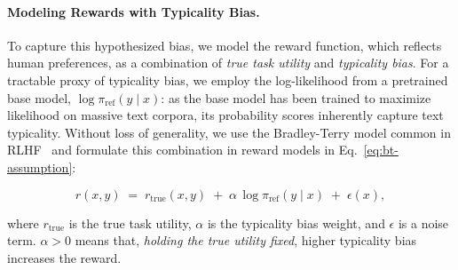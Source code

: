 \paragraph{Modeling Rewards with Typicality Bias.} To capture this hypothesized bias, we model the reward function, which reflects human preferences, as a combination of \emph{true task utility} and \emph{typicality bias}. For a tractable proxy of typicality bias, we employ the log-likelihood from a pretrained base model, $\log \pi_{\mathrm{ref}}(y\mid x)$: as the base model has been trained to maximize likelihood on massive text corpora, its probability scores inherently capture text typicality. {Without loss of generality, we use the Bradley-Terry model common in RLHF~\citep{bradley1952rank,christiano2017deep,ouyang2022training} and formulate this combination in reward models in Eq.~\ref{eq:bt-assumption}}: 







\begin{equation}
r(x,y) \;=\; r_{\text{true}}(x,y) \;+\; \alpha \,\log \pi_{\text{ref}}(y \mid x) \;+\; \epsilon(x),
\label{eq:bt-assumption}
\end{equation}

where \(r_{\text{true}}\) is the true task utility, 
$\alpha$ is the typicality bias weight, 
and
\(\epsilon\) is a noise term. \(\alpha>0\) means that, \emph{holding the true utility fixed},
higher typicality bias increases the reward.


